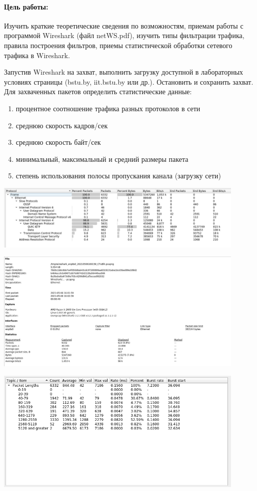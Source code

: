 \paragraph{Цель работы:}
Изучить краткие теоретические сведения по возможностям, приемам работы с программой Wireshark (файл netWS.pdf),
изучить типы фильтрации трафика, правила построения фильтров, приемы статистической обработки сетевого трафика в Wireshark.

Запустив Wireshark на захват, выполнить загрузку доступной в лабораторных условиях страницы (bstu.by, iit.bstu.by или др.).
Остановить и сохранить захват.
Для захваченных пакетов определить статистические данные:
\begin{enumerate}
    \item процентное соотношение трафика разных протоколов в сети
    \item среднюю скорость кадров/сек
    \item среднюю скорость байт/сек
    \item минимальный, максимальный и средний размеры пакета
    \item степень использования полосы пропускания канала (загрузку сети)
\end{enumerate}

\includegraphics[width=0.9\textwidth]{resources/allProtocols}

\includegraphics[width=0.9\textwidth]{resources/statisticBase}

\includegraphics[width=0.9\textwidth]{resources/minMaxSize}

